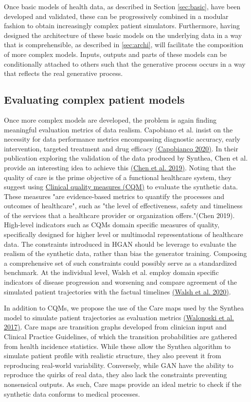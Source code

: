 \documentclass[10pt]{article}
\begin{document}
Once basic models of health data, as described in Section \ref{sec:basic}, have been developed and validated, these can be progressively combined in a modular fashion to obtain increasingly complex patient simulators. Furthermore, having designed the architecture of these basic models on the underlying data in a way that is comprehensible, as described in \ref{sec:archi}, will facilitate the composition of more complex models. Inputs, outputs and parts of these models can be conditionally attached to others such that the generative process occurs in a way that reflects the real generative process.

\subsection{Evaluating complex patient models}
Once more complex models are developed, the problem is again finding meaningful evaluation metrics of data realism. Capobiano et al. insist on the necessity for data performance metrics encompassing diagnostic accuracy, early intervention, targeted treatment and drug efficacy \hyperref[csl:65]{(Capobianco 2020)}. In their publication exploring the validation of the data produced by Synthea, Chen et al. provide an interesting idea to achieve this \hyperref[csl:68]{(Chen et al. 2019)}. Noting that the quality of care is the prime objective of a functional healthcare system, they suggest using \hyperlink{CQM}{Clinical quality measures (CQM)} to evaluate the synthetic data. These measures "are evidence-based metrics to quantify the processes and outcomes of healthcare", such as "the level of effectiveness, safety and timeliness of the services that a healthcare provider or organization offers."(Chen 2019). High-level indicators such as \hypertarget{CQM}{CQMs} domain specific measures of quality, specifically designed for higher level or multimodal representations of healthcare data. The constraints introduced in HGAN should be leverage to evaluate the realism of the synthetic data, rather than bias the generator training. Composing a comprehensive set of such constraints could possibly serve as a standardized benchmark.
At the individual level, Walsh et al. employ domain specific indicators of disease progression and worsening and compare agreement of the simulated patient trajectories with the factual timelines \hyperref[csl:12]{(Walsh et al. 2020)}.\par
In addition to \hypertarget{CQM}{CQMs}, we propose the use of the Care maps used by the Synthea model to simulate patient trajectories as evaluation metrics \hyperref[csl:69]{(Walonoski et al. 2017)}. Care maps are transition graphs developed from clinician input and Clinical Practice Guidelines, of which the transition probabilities are gathered from health incidence statistics. While these allow the Synthea algorithm to simulate patient profile with realistic structure, they also prevent it from reproducing real-world variability. Conversely, while GAN have the ability to reproduce the quirks of real data, they also lack the constraints preventing nonsensical outputs. As such, Care maps provide an ideal metric to check if the synthetic data conforms to medical processes.\par 
\end{document}
